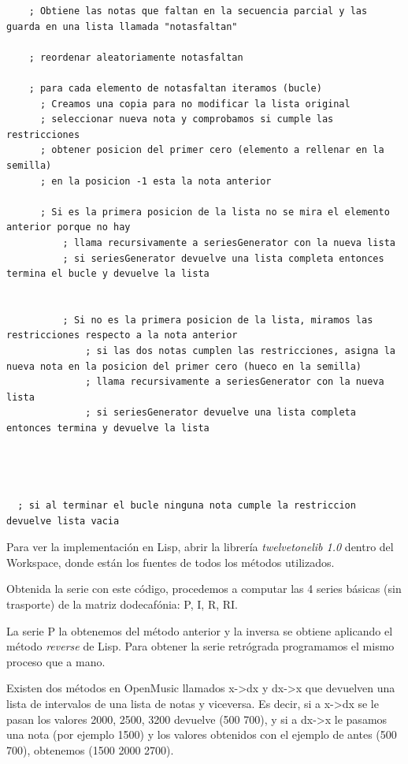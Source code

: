 \documentclass[a4paper,openright,12pt]{book}
\begin{document}
   \lstset{language=Lisp,
           basicstyle=\ttfamily\scriptsize,
           keywordstyle=\ttfamily,
           stringstyle=\ttfamily,
           commentstyle=\ttfamily,
          breaklines=true
          }
\begin{lstlisting}
    ; Obtiene las notas que faltan en la secuencia parcial y las guarda en una lista llamada "notasfaltan"

    ; reordenar aleatoriamente notasfaltan

  	; para cada elemento de notasfaltan iteramos (bucle)
      ; Creamos una copia para no modificar la lista original
      ; seleccionar nueva nota y comprobamos si cumple las restricciones
      ; obtener posicion del primer cero (elemento a rellenar en la semilla)
      ; en la posicion -1 esta la nota anterior
      
      ; Si es la primera posicion de la lista no se mira el elemento anterior porque no hay
          ; llama recursivamente a seriesGenerator con la nueva lista
          ; si seriesGenerator devuelve una lista completa entonces termina el bucle y devuelve la lista


          ; Si no es la primera posicion de la lista, miramos las restricciones respecto a la nota anterior
              ; si las dos notas cumplen las restricciones, asigna la nueva nota en la posicion del primer cero (hueco en la semilla)
              ; llama recursivamente a seriesGenerator con la nueva lista
              ; si seriesGenerator devuelve una lista completa entonces termina y devuelve la lista




  ; si al terminar el bucle ninguna nota cumple la restriccion devuelve lista vacia

\end{lstlisting}

Para ver la implementación en Lisp, abrir la librería \emph{twelvetonelib 1.0} dentro del Workspace, donde están los fuentes de todos los métodos utilizados.

Obtenida la serie con este código, procedemos a computar las 4 series básicas (sin trasporte) de la matriz dodecafónia: P, I, R, RI.

La serie P la obtenemos del método anterior y la inversa se obtiene aplicando el método \emph{reverse} de Lisp. Para obtener la serie retrógrada programamos el mismo proceso que a mano.

Existen dos métodos en OpenMusic llamados x->dx y dx->x que devuelven una lista de intervalos de una lista de notas y viceversa. Es decir, si a x->dx se le pasan los valores 2000, 2500, 3200 devuelve (500 700), y si a dx->x le pasamos una nota (por ejemplo 1500) y los valores obtenidos con el ejemplo de antes (500 700), obtenemos (1500 2000 2700).
\end{document}
